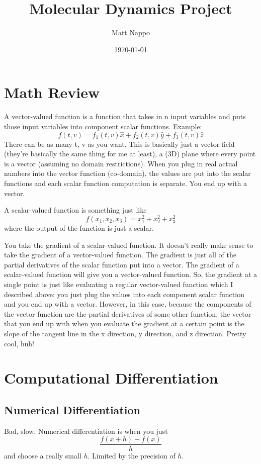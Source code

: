 \documentclass{article}
\title{Molecular Dynamics Project}
\author{Matt Nappo}
\date{\today}
\begin{document}
\section{Math Review}

A vector-valued function is a function that takes in n input variables and puts those input variables into component scalar functions. Example: $$f(t, v) = f_1(t, v)\hat x + f_2(t, v)\hat y + f_3(t, v)\hat z$$ There can be as many t, v as you want. This is basically just a vector field (they're basically the same thing for me at least), a (3D) plane where every point is a vector (assuming no domain restrictions). When you plug in real actual numbers into the vector function (co-domain), the values are put into the scalar functions and each scalar function computation is separate. You end up with a vector.

A scalar-valued function is something just like $$f(x_1, x_2, x_3) = x_1^2 + x_2^2 + x_3^2$$ where the output of the function is just a scalar.

You take the gradient of a scalar-valued function. It doesn't really make sense to take the gradient of a vector-valued function. The gradient is just all of the partial derivatives of the scalar function put into a vector. The gradient of a scalar-valued function will give you a vector-valued function. So, the gradient at a single point is just like evaluating a regular vector-valued function which I described above: you just plug the values into each component scalar function and you end up with a vector. However, in this case, because the components of the vector function are the partial derivatives of some other function, the vector that you end up with when you evaluate the gradient at a certain point is the slope of the tangent line in the x direction, y direction, and z direction. Pretty cool, huh!

\section {Computational Differentiation}

\subsection {Numerical Differentiation}
Bad, slow. Numerical differentiation is when you just $$\frac{f(x+h)-f(x)}{h}$$ and choose a really small $h$. Limited by the precision of $h$.
\end{document}
